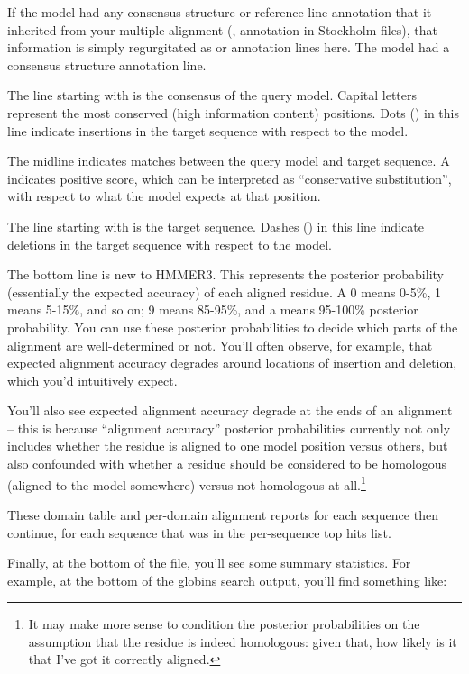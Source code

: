 If the model had any consensus structure or reference line annotation
that it inherited from your multiple alignment (,
 annotation in Stockholm files), that information is
simply regurgitated as  or  annotation lines
here. The  model had a consensus structure annotation line.

The line starting with  is the consensus of the query
model. Capital letters represent the most conserved (high information
content) positions. Dots () in this line indicate insertions
in the target sequence with respect to the model.

The midline indicates matches between the query model and target
sequence. A \prog{+} indicates positive score, which can be
interpreted as ``conservative substitution'', with respect to what the
model expects at that position.

The line starting with  is the target sequence.
Dashes (\prog{-}) in this line indicate deletions in the target
sequence with respect to the model.

The bottom line is new to HMMER3. This represents the posterior
probability (essentially the expected accuracy) of each aligned
residue. A 0 means 0-5\%, 1 means 5-15\%, and so on; 9 means 85-95\%,
and a \prog{*} means 95-100\% posterior probability. You can use these
posterior probabilities to decide which parts of the alignment are
well-determined or not. You'll often observe, for example, that
expected alignment accuracy degrades around locations of insertion and
deletion, which you'd intuitively expect. 

You'll also see expected alignment accuracy degrade at the ends of an
alignment -- this is because ``alignment accuracy'' posterior
probabilities currently not only includes whether the residue is
aligned to one model position versus others, but also confounded with
whether a residue should be considered to be homologous (aligned to
the model somewhere) versus not homologous at all.\footnote{It may
make more sense to condition the posterior probabilities on the
assumption that the residue is indeed homologous: given that, how
likely is it that I've got it correctly aligned.}


These domain table and per-domain alignment reports for each sequence
then continue, for each sequence that was in the per-sequence top hits
list.

Finally, at the bottom of the file, you'll see some summary
statistics.  For example, at the bottom of the globins search output,
you'll find something like:

